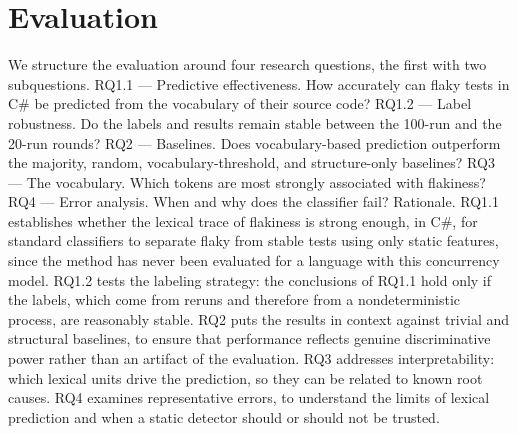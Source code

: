 \section{Evaluation}
We structure the evaluation around four research questions, the first with two subquestions.
RQ1.1 --- Predictive effectiveness. How accurately can flaky tests in C\# be predicted from the vocabulary of their source code?
RQ1.2 --- Label robustness. Do the labels and results remain stable between the 100-run and the 20-run rounds?
RQ2 --- Baselines. Does vocabulary-based prediction outperform the majority, random, vocabulary-threshold, and structure-only baselines?
RQ3 --- The vocabulary. Which tokens are most strongly associated with flakiness?
RQ4 --- Error analysis. When and why does the classifier fail?
Rationale. RQ1.1 establishes whether the lexical trace of flakiness is strong enough, in C\#, for standard classifiers to separate flaky from stable tests using only static features, since the method has never been evaluated for a language with this concurrency model. RQ1.2 tests the labeling strategy: the conclusions of RQ1.1 hold only if the labels, which come from reruns and therefore from a nondeterministic process, are reasonably stable. RQ2 puts the results in context against trivial and structural baselines, to ensure that performance reflects genuine discriminative power rather than an artifact of the evaluation. RQ3 addresses interpretability: which lexical units drive the prediction, so they can be related to known root causes. RQ4 examines representative errors, to understand the limits of lexical prediction and when a static detector should or should not be trusted.


